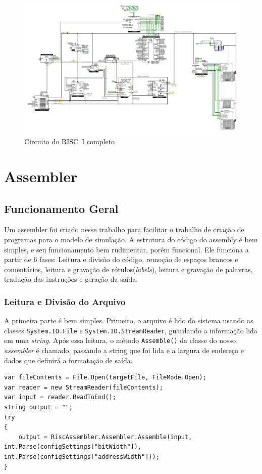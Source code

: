 \documentclass[
	article,			%
	11pt,				%
	oneside,			%
	a4paper,			%
	english,			%
	brazil,				%
	sumario=tradicional
	]{abntex2}
\begin{document}
\begin{figure}[H]
    \centering
    \includegraphics[width=1\linewidth]{Logisim/riscInternal.png}
    \caption{Circuito do RISC~I completo}
    \label{fig:internalCircuit}
\end{figure}
\section{Assembler}
\subsection{Funcionamento Geral}
Um assembler foi criado nesse trabalho para facilitar o trabalho de criação de programas para o modelo de simulação. A estrutura do código do assembly é bem simples, e seu funcionamento bem rudimentar, porém funcional. Ele funciona a partir de 6 fases: Leitura e divisão do código, remoção de espaços brancos e comentários, leitura e gravação de rótulos(\textit{labels}), leitura e gravação de palavras, tradução das instruções e geração da saída.

\subsubsection{Leitura e Divisão do Arquivo}
A primeira parte é bem simples. Primeiro, o arquivo é lido do sistema usando as classes \texttt{System.IO.File} e \texttt{System.IO.StreamReader}, guardando a informação lida em uma \textit{string}. Após essa leitura, o método \texttt{Assemble()} da classe do nosso \textit{assembler} é chamado, passando a string que foi lida e a largura de endereço e dados que definirá a formatação de saída.

\begin{lstlisting}
var fileContents = File.Open(targetFile, FileMode.Open);
var reader = new StreamReader(fileContents);
var input = reader.ReadToEnd();
string output = "";
try
{
    output = RiscAssembler.Assembler.Assemble(input, int.Parse(configSettings["bitWidth"]), int.Parse(configSettings["addressWidth"]));
}
\end{lstlisting}
\end{document}
